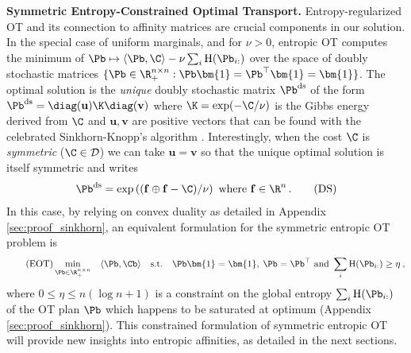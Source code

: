 \textbf{Symmetric Entropy-Constrained Optimal Transport.} Entropy-regularized
OT \cite{peyre2019computational} and its connection to affinity
matrices are crucial components in our solution. In the special case of uniform
marginals, and for $\nu > 0$, entropic OT computes the minimum of $\Pb
\mapsto \langle \Pb, \C \rangle -\nu \sum_{i} \operatorname{H}(\Pb_{i:})$
over the space of doubly stochastic matrices $\{\Pb \in \R_{+}^{n \times n} :
\Pb \bm{1} = \Pb^\top \bm{1} =\bm{1}\}$. The optimal solution is the
\emph{unique} doubly stochastic matrix $\Pb^{\mathrm{ds}}$ of the form $\Pb^{\mathrm{ds}}=\diag(\mathbf{u})\K
\diag(\mathbf{v})$ where $\K = \exp(-\C/\nu)$ is the Gibbs energy derived from
$\C$ and $\mathbf{u}, \mathbf{v}$ are positive vectors that can be found with
the celebrated Sinkhorn-Knopp’s algorithm \cite{cuturi2013sinkhorn,
sinkhorn1964relationship}. Interestingly, when the cost $\C$ is \emph{symmetric}
(\eg $\C \in \mathcal{D}$) we can take $\mathbf{u} = \mathbf{v}$ \cite[Section
5.2]{idel2016review} so that the unique optimal solution is itself symmetric and writes  
\begin{align}\label{eq:plan_sym_sinkhorn}
    \Pb^{\mathrm{ds}} = \exp \left((\mathbf{f} \oplus \mathbf{f} - \C) / \nu \right) \text{ where } \mathbf{f} \in \R^n \,.
\tag{DS}
\end{align}
In this case, by relying on convex duality as detailed in Appendix \ref{sec:proof_sinkhorn}, an equivalent formulation for the symmetric entropic OT problem is
\begin{equation}
\tag{EOT}
\label{eq:entropy_constrained_OT}
\min_{\Pb \in \R_{+}^{n \times n}} \quad \langle \Pb, \Cb \rangle \quad \text{s.t.} \quad \Pb \bm{1} = \bm{1}, \: \Pb = \Pb^\top \text{ and } \sum_i \operatorname{H}(\Pb_{i:}) \geq \eta \:,
\end{equation}
where $0 \leq \eta \leq n (\log n + 1)$ is a constraint on the global entropy $\sum_i \operatorname{H}(\Pb_{i:})$ of the OT plan $\Pb$ which happens to be saturated at optimum (Appendix \ref{sec:proof_sinkhorn}). This constrained formulation of symmetric entropic OT will provide new insights into entropic affinities, as detailed in the next sections.

